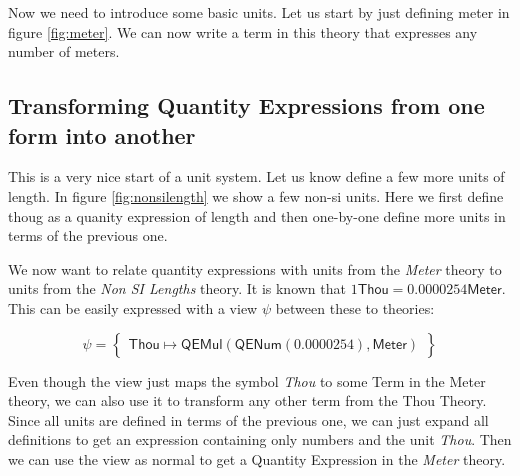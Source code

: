 Now we need to introduce some basic units. Let us start by just defining meter in figure \ref{fig:meter}. We can now write a term in this theory that expresses any number of meters.



\subsection{Transforming Quantity Expressions from one form into another}
\label{sec:qeconv}

This is a very nice start of a unit system. Let us know define a few more units of length. In figure \ref{fig:nonsilength} we show a few non-si units. Here we first define thoug as a quanity expression of length and then one-by-one define more units in terms of the previous one.


We now want to relate quantity expressions with units from the \textit{Meter} theory to units from the \textit{Non SI Lengths} theory. It is known that $1 \mathsf{Thou} = 0.0000254 \mathsf{Meter}$. This can be easily expressed with a view $\psi$ between these to theories:

\[
\psi = \left\{\begin{array}{l}
  \mathsf{Thou} \mapsto \mathsf{QEMul} \left( \mathsf{QENum} \left( 0.0000254 \right), \mathsf{Meter} \right)
\end{array}\right\}
\]

Even though the view just maps the symbol \textit{Thou} to some Term in the Meter theory, we can also use it to transform any other term from the Thou Theory. Since all units are defined in terms of the previous one, we can just expand all definitions to get an expression containing only numbers and the unit \textit{Thou}. Then we can use the view as normal to get a Quantity Expression in the \textit{Meter} theory.
